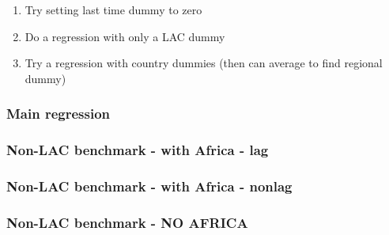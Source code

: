 \documentclass[12pt,english]{article}
\theoremstyle{remark}
\begin{document}
\begin{enumerate}
	\item Try setting last time dummy to zero
	\item Do a regression with only a LAC dummy
	\item Try a regression with country dummies (then can average to find regional dummy) 
\end{enumerate}

\pagebreak

\subsubsection{Main regression}

\footnotesize













\subsubsection{Non-LAC benchmark - with Africa - lag}



\subsubsection{Non-LAC benchmark - with Africa - nonlag}




\subsubsection{Non-LAC benchmark - NO AFRICA}




\end{document}
